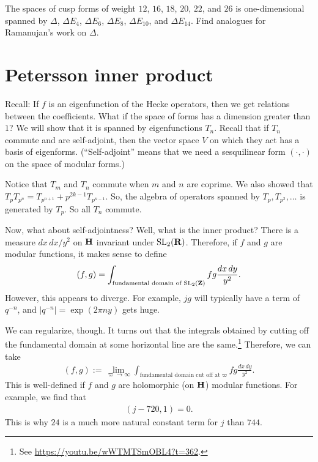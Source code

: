 \documentclass[11pt, oneside,margin=1in]{article}
\begin{document}
\begin{exercise}\label{}\text{}
The spaces of cusp forms of weight $12$, $16$, $18$, $20$, $22$, and $26$ is one-dimensional spanned by $\Delta$, $\Delta E_4$, $\Delta E_6$, $\Delta E_8$, $\Delta E_{10}$, and $\Delta E_{14}$. Find analogues for Ramanujan's work on $\Delta$.
\end{exercise}


\section{Petersson inner product}

Recall: If $f$ is an eigenfunction of the Hecke operators, then we get relations between the coefficients. What if the space of forms has a dimension greater than $1$? We will show that it is spanned by eigenfunctions $T_n$. Recall that if $T_n$ commute and are self-adjoint, then the vector space $V$ on which they act has a basis of eigenforms. (``Self-adjoint'' means that we need a sesquilinear form $(\cdot,\cdot)$ on the space of modular forms.)

Notice that $T_m$ and $T_n$ commute when $m$ and $n$ are coprime. We also showed that $T_pT_{p^n} = T_{p^{n+1}} + p^{2k-1}T_{p^{n-1}}$. So, the algebra of operators spanned by $T_p,T_{p^2},\hdots$ is generated by $T_p$. So all $T_n$ commute.

Now, what about self-adjointness? Well, what is the inner product? There is a measure $dx\,dx/y^2$ on $\mathbf H$ invariant under $\operatorname{SL}_{2}(\mathbf R)$. Therefore, if $f$ and $g$ are modular functions, it makes sense to define
\begin{align*}
	(f,g) =  \int_{\textrm{fundamental domain of $\operatorname{SL}_{2}(\mathbf Z)$}} fg\frac{dx\,dy}{y^2}. 
\end{align*}
However, this appears to diverge. For example, $jg$ will typically have a term of $q^{-n}$, and $\left\lvert q^{-n} \right\rvert = \exp(2\pi ny)$ gets huge.

We can regularize, though. It turns out that the integrals obtained by cutting off the fundamental domain at some horizontal line are the same.\footnote{See \url{https://youtu.be/wWTMTSmOBL4?t=362}.} Therefore, we can take
\begin{align*}
	(f,g) := \lim_{\varpi\to\infty}  \int_{\textrm{fundamental domain cut off at $\varpi$} }fg\frac{dx\,dy}{y^2}. 
\end{align*}
This is well-defined if $f$ and $g$ are holomorphic (on $\mathbf H$) modular functions. For example, we find that
\begin{align*}
	(j-720, 1) = 0.
\end{align*}
This is why $24$ is a much more natural constant term for $j$ than $744$.
\end{document}
